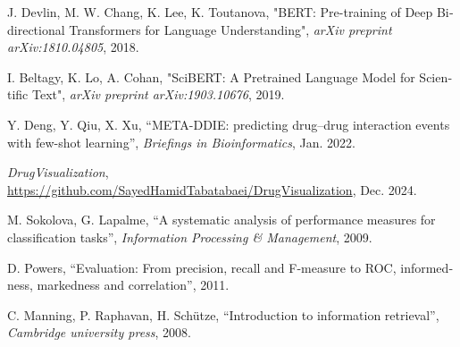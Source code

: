 \begin{thebibliography}{99}
\begin{latin}
J. Devlin, M. W. Chang, K. Lee, K. Toutanova, "BERT: Pre-training of Deep Bidirectional Transformers for Language Understanding", \textit{arXiv preprint arXiv:1810.04805}, 2018.

I. Beltagy, K. Lo, A. Cohan, "SciBERT: A Pretrained Language Model for Scientific Text", \textit{arXiv preprint arXiv:1903.10676}, 2019.

Y. Deng, Y. Qiu, X. Xu, “META-DDIE: predicting drug–drug interaction events with few-shot learning”, \textit{Briefings in Bioinformatics}, Jan. 2022.

\textit{DrugVisualization}, \url{https://github.com/SayedHamidTabatabaei/DrugVisualization}, Dec. 2024.

M. Sokolova, G. Lapalme, “A systematic analysis of performance measures for classification tasks”, \textit{Information Processing \& Management}, 2009.

D. Powers, “Evaluation: From precision, recall and F-measure to ROC, informedness, markedness and correlation”, 2011.

C. Manning, P. Raphavan, H. Schütze, “Introduction to information retrieval”, \textit{Cambridge university press}, 2008.













\end{latin}


\end{thebibliography}
